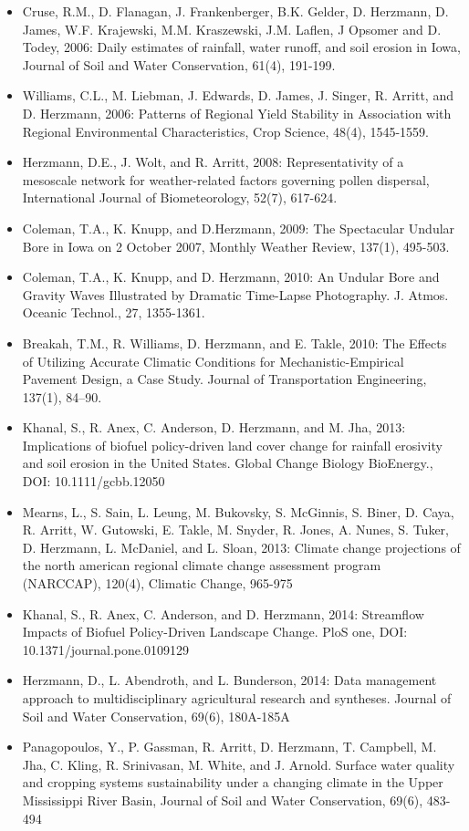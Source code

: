 \begin{itemize}
\item Cruse, R.M., D. Flanagan, J. Frankenberger, B.K. Gelder, D. Herzmann, D. James, W.F. Krajewski, M.M. Kraszewski, J.M. Laflen, J Opsomer and D. Todey, 2006: Daily estimates of rainfall, water runoff, and soil erosion in Iowa, Journal of Soil and Water Conservation, 61(4), 191-199.
\item Williams, C.L., M. Liebman, J. Edwards, D. James, J. Singer, R. Arritt, and D. Herzmann, 2006: Patterns of Regional Yield Stability in Association with Regional Environmental Characteristics, Crop Science, 48(4), 1545-1559.
\item Herzmann, D.E., J. Wolt, and R. Arritt, 2008: Representativity of a mesoscale network for weather-related factors governing pollen dispersal, International Journal of Biometeorology, 52(7), 617-624.
\item Coleman, T.A., K. Knupp, and D.Herzmann, 2009: The Spectacular Undular Bore in Iowa on 2 October 2007, Monthly Weather Review, 137(1), 495-503.
\item Coleman, T.A., K. Knupp, and D. Herzmann, 2010: An Undular Bore and Gravity Waves Illustrated by Dramatic Time-Lapse Photography. J. Atmos. Oceanic Technol., 27, 1355-1361.
\item Breakah, T.M., R. Williams, D. Herzmann, and E. Takle, 2010: The Effects of Utilizing Accurate Climatic Conditions for Mechanistic-Empirical Pavement Design, a Case Study. Journal of Transportation Engineering, 137(1), 84–90.
\item Khanal, S., R. Anex, C. Anderson, D. Herzmann, and M. Jha, 2013: Implications of biofuel policy-driven land cover change for rainfall erosivity and soil erosion in the United States. Global Change Biology BioEnergy., DOI: 10.1111/gcbb.12050
\item Mearns, L., S. Sain, L. Leung, M. Bukovsky, S. McGinnis, S. Biner, D. Caya, R. Arritt, W. Gutowski, E. Takle, M. Snyder, R. Jones, A. Nunes, S. Tuker, D. Herzmann, L. McDaniel, and L. Sloan, 2013: Climate change projections of the north american regional climate change assessment program (NARCCAP), 120(4), Climatic Change, 965-975
\item Khanal, S., R. Anex, C. Anderson, and D. Herzmann, 2014: Streamflow Impacts of Biofuel Policy-Driven Landscape Change. PloS one, DOI: 10.1371/journal.pone.0109129
\item Herzmann, D., L. Abendroth, and L. Bunderson, 2014: Data management approach to multidisciplinary agricultural research and syntheses. Journal of Soil and Water Conservation, 69(6), 180A-185A
\item Panagopoulos, Y., P. Gassman, R. Arritt, D. Herzmann, T. Campbell, M. Jha, C. Kling, R. Srinivasan, M. White, and J. Arnold. Surface water quality and cropping systems sustainability under a changing climate in the Upper Mississippi River Basin, Journal of Soil and Water Conservation, 69(6), 483-494
\end{itemize}
